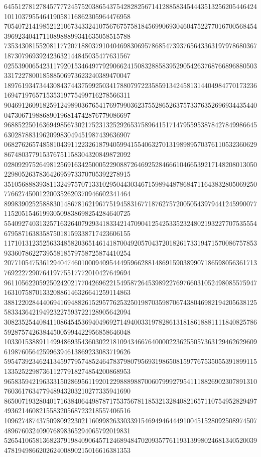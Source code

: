\begin{DoxyCode}
      645512781278457777245752038654375428282567141288583454443513256205446424101103795546419058116862305964476958
      705407214198521210673433241075676757581845699069304604752277016700568454396923404171108988899341635058515788
      735343081552081177207188037910404698306957868547393765643363197978680367187307969392423632144845035477631567
      025539006542311792015346497792906624150832885839529054263768766896880503331722780018588506973623240389470047
      189761934734430843744375992503417880797223585913424581314404984770173236169471976571535319775499716278566311
      904691260918259124989036765417697990362375528652637573376352696934435440047306719886890196814742876779086697
      968852250163694985673021752313252926537589641517147955953878427849986645630287883196209983049451987439636907
      068276265748581043911223261879405994155406327013198989570376110532360629867480377915376751158304320849872092
      028092975264981256916342500052290887264692528466610466539217148208013050229805263783642695973370705392278915
      351056888393811324975707133102950443034671598944878684711643832805069250776627450012200352620370946602341464
      899839025258883014867816219677519458316771876275720050543979441245990077115205154619930509838698254284640725
      554092740313257163264079293418334214709041254253352324802193227707535554679587163835875018159338717423606155
      117101312352563348582036514614187004920570437201826173319471570086757853933607862273955818579758725874410254
      207710547536129404746010009409544495966288148691590389907186598056361713769222729076419775517772010427649694
      961105622059250242021770426962215495872645398922769766031052498085575947163107587013320886146326641259114863
      388122028444069416948826152957762532501987035987067438046982194205638125583343642194923227593722128905642094
      308235254408411086454536940496927149400331978286131818618881111840825786592875742638445005994422956858646048
      103301538891149948693543603022181094346676400002236255057363129462629609619876056425996394613869233083719626
      595473923462413459779574852464783798079569319865081597767535055391899115133525229873611277918274854200868953
      965835942196333150286956119201229888988700607999279541118826902307891310760361763477948943203210277335941690
      865007193280401716384064498787175375678118532132840821657110754952829497493621460821558320568723218557406516
      109627487437509809223021160998263303391546949464449100451528092508974507489676032409076898365294065792019831
      526541065813682379198409064571246894847020935776119313998024681340520039478194986620262400890215016616381353

\end{DoxyCode}
